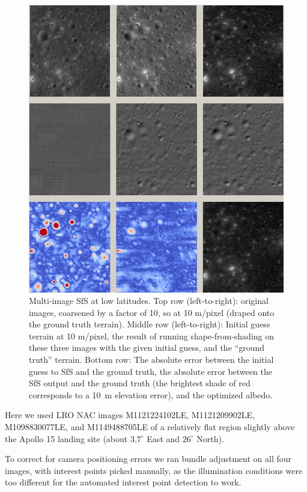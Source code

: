 \documentclass[12pt,oneside]{article}
\begin{document}
\begin{figure}[h!]
\includegraphics[width=6in]{figures/sfs2.jpg}
    \caption[Photoclinometry example]{
      \label{fig:sfs2} Multi-image SfS at low latitudes. Top row (left-to-right): original
      images, coarsened by a factor of 10, so at 10 m/pixel (draped
      onto the ground truth terrain). Middle row (left-to-right):
      Initial guess terrain at 10 m/pixel, the result of running
      shape-from-shading on these three images with the given initial
      guess, and the ``ground truth'' terrain. Bottom row: The absolute
      error between the initial guess to SfS and the ground truth, the absolute error
      between the SfS output and the ground truth (the brightest shade of
      red corresponds to a 10~m elevation error), and the optimized albedo.}
\end{figure}

Here we used LRO NAC images M1121224102LE, M1121209902LE, M1098830077LE, and M1149488705LE 
of a relatively flat region slightly above the Apollo 15
landing site (about $3.7^\circ$ East and $26^\circ$ North).

To correct for camera positioning errors we ran bundle adjustment on all
four images, with interest points picked manually, as the illumination
conditions were too different for the automated interest point
detection to work. 
\end{document}

